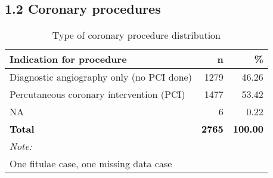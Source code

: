\documentclass[
]{article}
\begin{document}
\hypertarget{coronary-procedures}{%
\subsection{1.2 Coronary procedures}\label{coronary-procedures}}

\begin{longtable}[t]{lrr}
\caption{\label{tab:table 3}Type of coronary procedure distribution}\\
\toprule
Indication for procedure & n & \%\\
\midrule
Diagnostic angiography only (no PCI done) & 1279 & 46.26\\
Percutaneous coronary intervention (PCI) & 1477 & 53.42\\
NA & 6 & 0.22\\
\textcolor{black}{\textbf{Total}} & \textcolor{black}{\textbf{2765}} & \textcolor{black}{\textbf{100.00}}\\
\bottomrule
\multicolumn{3}{l}{\rule{0pt}{1em}\textit{Note: }}\\
\multicolumn{3}{l}{\rule{0pt}{1em}One fitulae case, one missing data case}\\
\end{longtable}
\end{document}
